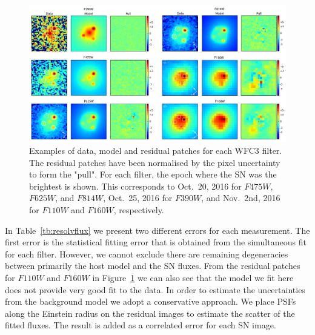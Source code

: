 \documentclass[a4paper,fleqn,usenatbib]{mnras}
\newcommand{\sn}{SN\xspace}
\newcommand{\wfc}{WFC3\xspace}
\newcommand{\wfcuvis}{WFC3/UVIS\xspace}
\newcommand{\wfcir}{WFC3/IR\xspace}
\newcommand{\jband}{{\it J}\xspace}
\newcommand{\hstu}{$F390W$\xspace}
\newcommand{\hstb}{$F475W$\xspace}
\newcommand{\hstr}{$F625W$\xspace}
\newcommand{\hsti}{$F814W$\xspace}
\newcommand{\hstj}{$F110W$\xspace}
\newcommand{\hsth}{$F160W$\xspace}
\begin{document}
\begin{figure}
	\centering
	\caption{%
		Examples of data, model and residual patches for each \wfc filter.  The residual patches have been normalised by the 
		pixel uncertainty to form the "pull".  For each filter, the epoch where the \sn was the brightest is shown.  This corresponds
		to Oct.~20, 2016 for \hstb, \hstr, and \hsti, Oct.~25, 2016 for \hstu, and Nov.~2nd, 2016 for \hstj and \hsth, respectively.
	\label{fig:wfcforward}}
	\includegraphics[width=\textwidth]{wfc3_patches.pdf}
\end{figure}

%  

In Table~\ref{tb:resolvflux} we present two different errors for each measurement.  The first error is the statistical fitting error that is obtained 
from the simultaneous fit for each filter.  However, we cannot exclude there are remaining degeneracies between primarily the host model
and the \sn fluxes.  From the residual patches for \hstj and \hsth in Figure~\ref{fig:wfcforward} we can also see that the model we fit
here does not provide very good fit to the data.  In order to estimate the uncertainties from the background model we adopt a conservative
approach.  We place PSFs along the Einstein radius on the residual images to estimate the scatter of the fitted fluxes.  The result is added
as a correlated error for each \sn image.
\end{document}
